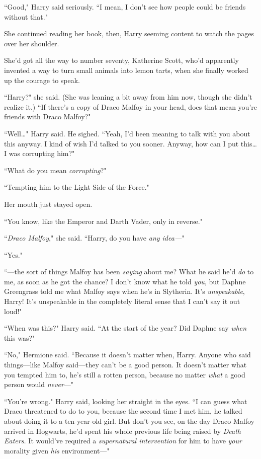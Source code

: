 ``Good," Harry said seriously. ``I mean, I don't see how people could be friends without that."

She continued reading her book, then, Harry seeming content to watch the pages over her shoulder.

She'd got all the way to number seventy, Katherine Scott, who'd apparently invented a way to turn small animals into lemon tarts, when she finally worked up the courage to speak.

``Harry?" she said. (She was leaning a bit away from him now, though she didn't realize it.) ``If there's a copy of Draco Malfoy in your head, does that mean you're friends with Draco Malfoy?"

``Well{\ldots}" Harry said. He sighed. ``Yeah, I'd been meaning to talk with you about this anyway. I kind of wish I'd talked to you sooner. Anyway, how can I put this{\ldots} I was corrupting him?"

``What do you mean \emph{corrupting}?"

``Tempting him to the Light Side of the Force."

Her mouth just stayed open.

``You know, like the Emperor and Darth Vader, only in reverse."

``\emph{Draco Malfoy}," she said. ``Harry, do you have \emph{any idea—}"

``Yes."

``—the sort of things Malfoy has been \emph{saying} about me? What he said he'd \emph{do} to me, as soon as he got the chance? I don't know what he told \emph{you}, but Daphne Greengrass told me what Malfoy says when he's in Slytherin. It's \emph{unspeakable}, Harry! It's unspeakable in the completely literal sense that I can't say it out loud!"

``When was this?" Harry said. ``At the start of the year? Did Daphne say \emph{when} this was?"

``No," Hermione said. ``Because it doesn't matter when, Harry. Anyone who said things—like Malfoy said—they can't be a good person. It doesn't matter what you tempted him to, he's still a rotten person, because no matter \emph{what} a good person would \emph{never}—"

``You're wrong." Harry said, looking her straight in the eyes. ``I can guess what Draco threatened to do to you, because the second time I met him, he talked about doing it to a ten-year-old girl. But don't you see, on the day Draco Malfoy arrived in Hogwarts, he'd spent his whole previous life being raised by \emph{Death Eaters.} It would've required a \emph{supernatural intervention} for him to have \emph{your} morality given \emph{his} environment—"

